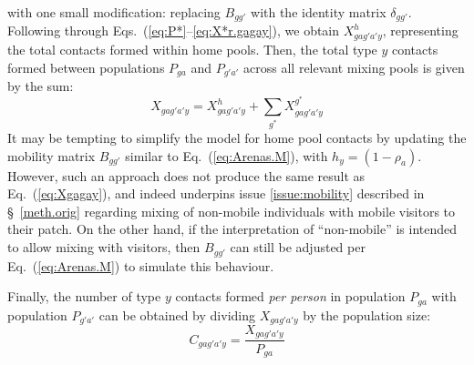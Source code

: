 with one small modification: replacing $B_{gg'}$ with the identity matrix $\delta_{gg'}$.
Following through Eqs.~(\ref{eq:P*}--\ref{eq:X*r.gagay}), we obtain $X^{h}_{gag'a'y}$,
representing the total contacts formed within home pools.
Then, the total type $y$ contacts formed between populations $P_{ga}$ and $P_{g'a'}$
across all relevant mixing pools is given by the sum:
\begin{equation}\label{eq:Xgagay}
  X_{gag'a'y} = X^h_{gag'a'y} + \sum_{g^*} X^{g^*}_{gag'a'y}
\end{equation}
It may be tempting to simplify the model for home pool contacts by
updating the mobility matrix $B_{gg'}$ similar to Eq.~(\ref{eq:Arenas.M}), with $h_y = (1-\rho_a)$.
However, such an approach does not produce the same result as Eq.~(\ref{eq:Xgagay}),
and indeed underpins issue \ref{issue:mobility} described in \S~\ref{meth.orig}
regarding mixing of non-mobile individuals with mobile visitors to their patch.
On the other hand, if the interpretation of ``non-mobile'' is intended to allow mixing with visitors,
then $B_{gg'}$ can still be adjusted per Eq.~(\ref{eq:Arenas.M}) to simulate this behaviour.
\par
Finally, the number of type $y$ contacts formed \textit{per person}
in population $P_{ga}$ with population $P_{g'a'}$ can be obtained by
dividing $X_{gag'a'y}$ by the population size:
\begin{equation}\label{eq:Cgagay}
  C_{gag'a'y} = \frac{X_{gag'a'y}}{P_{ga}}
\end{equation}